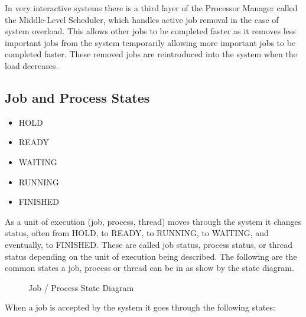 \documentclass[12pt letter]{report}
\begin{document}
In very interactive systems there is a third layer of the Processor
Manager called the Middle-Level Scheduler, which handles active job
removal in the case of system overload. This allows other jobs to be
completed faster as it removes less important jobs from the system
temporarily allowing more important jobs to be completed faster.
These removed jobs are reintroduced into the system when the load decreases.

\subsection{Job and Process States}
\begin{itemize}
  \item HOLD
  \item READY
  \item WAITING
  \item RUNNING
  \item FINISHED
\end{itemize}

As a unit of execution (job, process, thread) moves through the
system it changes status, often from HOLD, to READY, to RUNNING, to
WAITING, and eventually, to FINISHED. These are called job status,
process status, or thread status depending on the unit of execution
being described. The following are the common states a job, process
or thread can be in as show by the state diagram.

\begin{figure}[H]
  \centering
  \caption{Job / Process State Diagram}
\end{figure}

When a job is accepted by the system it goes through the following states:
\end{document}
